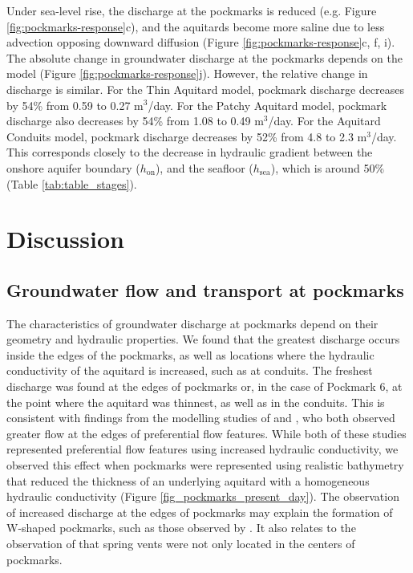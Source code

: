 \documentclass[pdflatex,sn-apa]{sn-jnl}%
\begin{document}
Under sea-level rise, the discharge at the pockmarks is reduced (e.g. Figure \ref{fig:pockmarks-response}c),
and the aquitards become more saline due to less advection opposing downward diffusion (Figure \ref{fig:pockmarks-response}c, f, i).
The absolute change in groundwater discharge at the pockmarks depends on the model (Figure \ref{fig:pockmarks-response}j).
However, the relative change in discharge is similar. For the Thin Aquitard model, pockmark discharge decreases by 54\% from 0.59 to 0.27 m$^3$/day.
For the Patchy Aquitard model, pockmark discharge also decreases by 54\% from 1.08 to 0.49 m$^3$/day.
For the Aquitard Conduits model, pockmark discharge decreases by 52\% from 4.8 to 2.3 m$^3$/day.
This corresponds closely to the decrease in hydraulic gradient between the onshore aquifer boundary ($h_{\mathrm{on}}$), and the seafloor ($h_{\mathrm{sea}}$),
which is around 50\% (Table \ref{tab:table_stages}).

\section{Discussion}

\subsection{Groundwater flow and transport at pockmarks}
The characteristics of groundwater discharge at pockmarks depend on their geometry and hydraulic properties.
We found that the greatest discharge occurs inside the edges of the pockmarks, as well as locations where the hydraulic conductivity of the aquitard is increased, such as at conduits.
The freshest discharge was found at the edges of pockmarks or, in the case of Pockmark 6, at the point where the aquitard was thinnest, as well as in the conduits.
This is consistent with findings from the modelling studies of \cite{kaleris_modelling_2002} and \cite{mulligan_role_2007}, who both observed greater flow at the edges of preferential flow features.
While both of these studies represented preferential flow features using increased hydraulic conductivity,
we observed this effect when pockmarks were represented using realistic bathymetry that reduced the thickness of an underlying aquitard with a homogeneous hydraulic conductivity (Figure \ref{fig_pockmarks_present_day}).
The observation of increased discharge at the edges of pockmarks may explain the formation of W-shaped pockmarks, such as those observed by \cite{matciak_pockmarks_2024}.
It also relates to the observation of \cite{harding_characteristics_2000} that spring vents were not only located in the centers of pockmarks.
\end{document}
